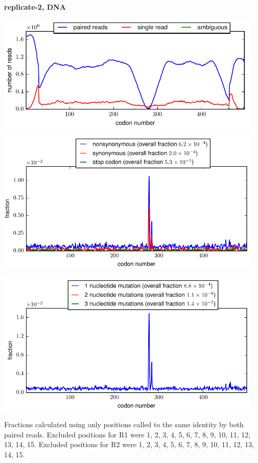 \documentclass[10pt,letterpaper]{article}
\begin{document}
\centerline{\Large \bf replicate-2, DNA}
\vspace{0.1in}

\centerline{\includegraphics[width=5in]{replicate-2-DNA_codondepth.pdf}}
\vspace{0.1in}

\centerline{\includegraphics[width=5in]{replicate-2-DNA_syn-ns-dist.pdf}}
\vspace{0.1in}

\centerline{\includegraphics[width=5in]{replicate-2-DNA_nmutspercodon-dist.pdf}}
\vspace{0.1in}

Fractions calculated using only positions called to the same identity by both paired reads.  Excluded positions for R1 were 1, 2, 3, 4, 5, 6, 7, 8, 9, 10, 11, 12, 13, 14, 15. 
 Excluded positions for R2 were 1, 2, 3, 4, 5, 6, 7, 8, 9, 10, 11, 12, 13, 14, 15. 
\end{document}
